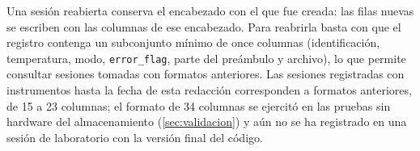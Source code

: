 Una sesión reabierta conserva el encabezado con el que fue creada: las
filas nuevas se escriben con las columnas de ese encabezado. Para
reabrirla basta con que el registro contenga un subconjunto mínimo de
once columnas (identificación, temperatura, modo, \texttt{error\_flag},
parte del preámbulo y archivo), lo que permite
consultar sesiones tomadas con formatos anteriores. Las sesiones
registradas con instrumentos hasta la fecha de esta redacción
corresponden a formatos anteriores, de 15 a 23 columnas; el formato de
34 columnas se ejercitó en las pruebas sin hardware del almacenamiento
(\cref{sec:validacion}) y aún no se ha registrado en una sesión de
laboratorio con la versión final del código.
